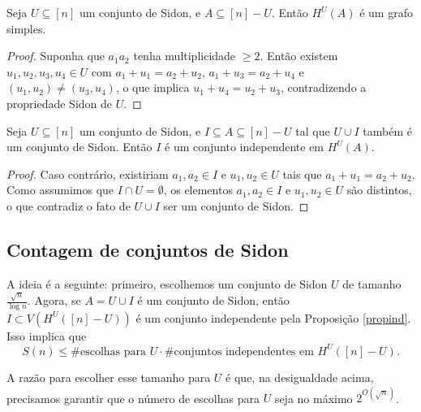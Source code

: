 \documentclass[reqno,a4paper,12pt]{amsart}
\begin{document}
\begin{proposition}
  \label{propsimple}
  Seja $U \subseteq [n]$ um conjunto de Sidon, e $A \subseteq [n] - U$. Então $H^U(A)$ é um grafo simples.
\end{proposition}

\begin{proof}
  Suponha que $a_1a_2$ tenha multiplicidade $\geq 2$. Então existem
  $u_1, u_2, u_3, u_4 \in U$ com $a_1 + u_1 = a_2 + u_2$, $a_1 + u_3 = a_2 + u_4$
  e $(u_1, u_2) \neq (u_3, u_4)$, o que implica $u_1 + u_4 = u_2 + u_3$,
  contradizendo a propriedade Sidon de $U$.
\end{proof}

\begin{proposition}
  \label{propind}
  Seja $U \subseteq [n]$ um conjunto de Sidon, e $I \subseteq A \subseteq [n] - U$ tal que $U \cup I$ também é um conjunto de Sidon. Então $I$ é um conjunto independente em $H^U(A)$.
\end{proposition}

\begin{proof}
  Caso contrário, existiriam $a_1, a_2 \in I$ e $u_1, u_2 \in U$ tais que $a_1 + u_1 = a_2 + u_2$. Como assumimos que $I \cap U = \emptyset$, os elementos $a_1, a_2 \in I$ e $u_1, u_2 \in U$ são distintos, o que contradiz o fato de $U \cup I$ ser um conjunto de Sidon.
\end{proof}


\setcounter{subsection}{3}
\subsection{Contagem de conjuntos de Sidon}

A ideia é a seguinte: primeiro, escolhemos um conjunto de Sidon $U$ de tamanho $\frac{\sqrt{n}}{\log n}$. Agora, se $A = U \cup I$ é um conjunto de Sidon, então $I \subset V(H^U([n] - U))$ é um conjunto independente pela Proposição \ref{propind}. Isso implica que
$$ S(n) \leqslant \#\text{escolhas para } U \cdot \#\text{conjuntos independentes em } H^U([n] - U). $$

A razão para escolher esse tamanho para $U$ é que, na desigualdade acima, precisamos garantir que o número de escolhas para $U$ seja no máximo $2^{O(\sqrt{n})}$.
\end{document}
